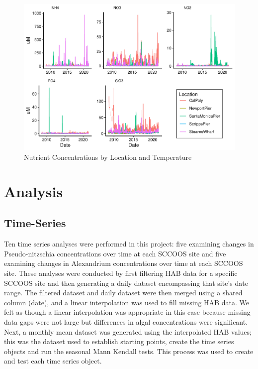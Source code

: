\documentclass[
  12pt,
]{article}
\begin{document}
\begin{figure}
\centering
\includegraphics{Habs_Final_Report_files/figure-latex/Exploratory Analysis Part 3-1.pdf}
\caption{Nutrient Concentrations by Location and Temperature}
\end{figure}

\newpage

\hypertarget{analysis}{%
\section{Analysis}\label{analysis}}

\hypertarget{time-series}{%
\subsection{Time-Series}\label{time-series}}

Ten time series analyses were performed in this project: five examining
changes in Pseudo-nitzschia concentrations over time at each SCCOOS site
and five examining changes in Alexandrium concentrations over time at
each SCCOOS site. These analyses were conducted by first filtering HAB
data for a specific SCCOOS site and then generating a daily dataset
encompassing that site's date range. The filtered dataset and daily
dataset were then merged using a shared column (date), and a linear
interpolation was used to fill missing HAB data. We felt as though a
linear interpolation was appropriate in this case because missing data
gaps were not large but differences in algal concentrations were
significant. Next, a monthly mean dataset was generated using the
interpolated HAB values; this was the dataset used to establish starting
points, create the time series objects and run the seasonal Mann Kendall
tests. This process was used to create and test each time series object.
\end{document}
